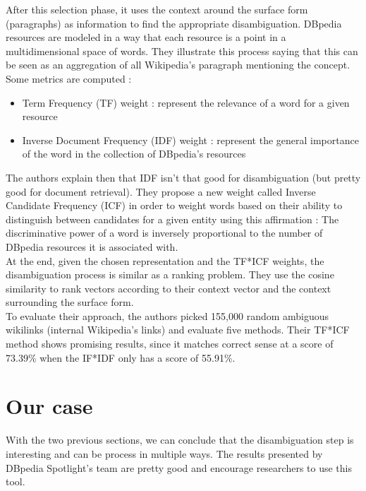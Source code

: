 After this selection phase, it uses the context around the surface form (paragraphs) as information to find the appropriate disambiguation. DBpedia resources are modeled in a way that each resource is a point in a multidimensional space of words. They illustrate this process saying that this can be seen as an aggregation of all Wikipedia's paragraph mentioning the concept. Some metrics are computed :
\begin{itemize}
	\item Term Frequency (TF) weight : represent the relevance of a word for a given resource
	\item Inverse Document Frequency (IDF) weight : represent the general importance of the word in the collection of DBpedia's resources
\end{itemize}
The authors explain then that IDF isn't that good for disambiguation (but pretty good for document retrieval). They propose a new weight called Inverse Candidate Frequency (ICF) in order to weight words based on their ability to distinguish between candidates for a given entity using this affirmation : The discriminative power of a word is inversely proportional to the number of DBpedia resources it is associated with.\\

At the end, given the chosen representation and the TF*ICF weights, the disambiguation process is similar as a ranking problem. They use the cosine similarity to rank vectors according to their context vector and the context surrounding  the surface form.\\

To evaluate their approach, the authors picked 155,000 random ambiguous wikilinks (internal Wikipedia's links) and evaluate five methods. Their TF*ICF method shows promising results, since it matches correct sense at a score of 73.39\% when the IF*IDF only has a score of 55.91\%.

\section{Our case} %
\label{sec:our_case}
With the two previous sections, we can conclude that the disambiguation step is interesting and can be process in multiple ways. The results presented by DBpedia Spotlight's team are pretty good and encourage researchers to use this tool.\\

